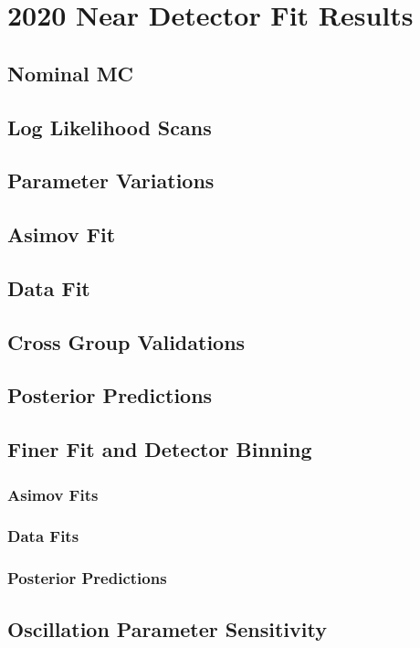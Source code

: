 \chapter{2020 Near Detector Fit Results}\label{sec:2020Fit}
\section{Nominal MC}
\section{Log Likelihood Scans}\label{sec:llhscan}
\section{Parameter Variations}
\section{Asimov Fit}\label{sec:asimov}
\section{Data Fit}
\section{Cross Group Validations}
\section{Posterior Predictions}
\section{Finer Fit and Detector Binning}
\subsection{Asimov Fits}
\subsection{Data Fits}
\subsection{Posterior Predictions}
\section{Oscillation Parameter Sensitivity}

\newpage